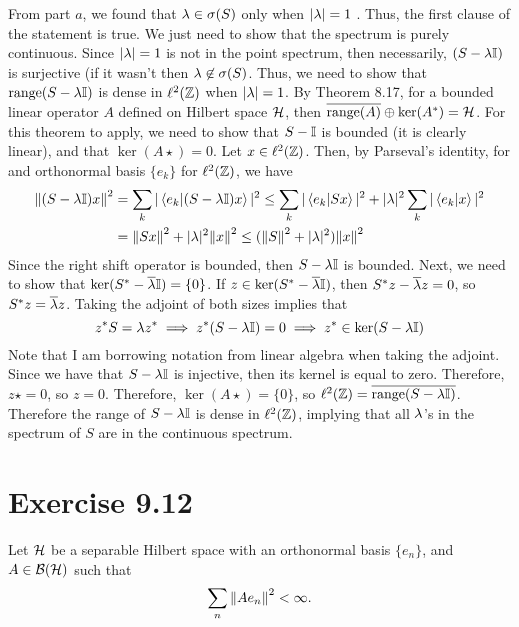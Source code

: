 \begin{solution}
\begin{enumerate}[a)]
        \hop
        From part $a$, we found that $\mathrm{\lambda} \in \sigma(S)$ only when $|\mathrm{\lambda}| = 1$ . Thus, the first clause of the statement is true. We just need to show that the spectrum is purely continuous. Since $|\mathrm{\lambda}| = 1$ is not in the point spectrum, then necessarily, $(S - \mathrm{\lambda}\mathbb{I})$ is surjective (if it wasn't then $\mathrm{\lambda} \not \in \sigma(S)$. Thus, we need to show that $\text{range}(S - \mathrm{\lambda} \mathbb{I})$ is dense in $\ell^2(\mathbb{Z})$ when $|\mathrm{\lambda}| = 1$. By Theorem 8.17, for a bounded linear operator $A$ defined on Hilbert space $\mathcal{H}$, then $\overline{\text{range}(A)} \oplus \ker(A^{*}) = \mathcal{H}$. For this theorem to apply, we need to show that $S - \mathbb{I}$ is bounded (it is clearly linear), and that $\ker (A\star) = 0$. Let $x \in \ell^2(\mathbb{Z})$. Then, by Parseval's identity, for and orthonormal basis $\{e_k\}$ for $\ell^2(\mathbb{Z})$, we have
        \begin{align*}
            \norm{(S - \mathrm{\lambda}\mathbb{I})x}^2 &= \sum_k |\braket{e_k}{(S - \mathrm{\lambda}\mathbb{I})x}|^2 \leq \sum_k|\braket{e_k}{Sx}|^2 + |\mathrm{\lambda}|^2\sum_k|\braket{e_k}{x}|^2 \\
            &= \norm{Sx}^2 + |\mathrm{\lambda}|^2\norm{x}^2 \leq (\norm{S}^2 + |\mathrm{\lambda}|^2)\norm{x}^2
        \end{align*}
        Since the right shift operator is bounded, then $S - \mathrm{\lambda}\mathbb{I}$ is bounded. Next, we need to show that $\ker(S^{*} - \overline{\mathrm{\lambda}}\mathbb{I}) = \{0\}$. If $z \in \ker (S^{*} - \overline{\mathrm{\lambda}}\mathbb{I})$, then $S^{*} z - \overline{\mathrm{\lambda}} z = 0$, so $S^{*} z = \overline{\mathrm{\lambda}} z$. Taking the adjoint of both sizes implies that 
        \[z^{*} S = \mathrm{\lambda} z^{*} \implies z^{*}(S - \mathrm{\lambda}\mathbb{I}) = 0 \implies z^{*} \in \ker (S - \mathrm{\lambda}\mathbb{I})\]
        Note that I am borrowing notation from linear algebra when taking the adjoint. Since we have that $S - \mathrm{\lambda}\mathbb{I}$ is injective, then its kernel is equal to zero. Therefore, $z\star = 0$, so $z = 0$. Therefore, $\ker(A\star) = \{0\}$, so $\ell^2(\mathbb{Z}) = \overline{\text{range}(S -\mathrm{\lambda}\mathbb{I})}$. Therefore the range of $S - \mathrm{\lambda}\mathbb{I}$ is dense in $\ell^2(\mathbb{Z})$, implying that all $\mathrm{\lambda}$'s in the spectrum of $S$ are in the continuous spectrum. 
    \end{enumerate}
\end{solution}

\newpage
\section{Exercise 9.12}
Let $\mathcal{H}$ be a separable Hilbert space with an orthonormal basis $\{e_n\}$, and $A\in \mathcal{B}(\mathcal{H})$ such that
\[\sum_n \norm{Ae_n}^2 < \infty.\]
